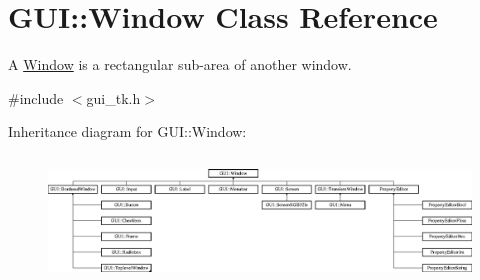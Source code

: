 \hypertarget{classGUI_1_1Window}{\section{G\-U\-I\-:\-:Window Class Reference}
\label{classGUI_1_1Window}
}


A \hyperlink{classGUI_1_1Window}{Window} is a rectangular sub-\/area of another window.  




{\ttfamily \#include $<$gui\-\_\-tk.\-h$>$}

Inheritance diagram for G\-U\-I\-:\-:Window\-:\begin{figure}[H]
\begin{center}
\leavevmode
\includegraphics[height=3.426573cm]{classGUI_1_1Window}
\end{center}
\end{figure}
